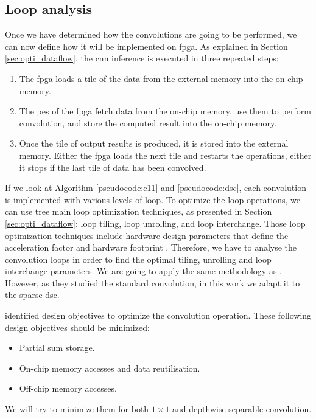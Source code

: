 \subsection{Loop analysis}
%
Once we have determined how the convolutions are going to be performed, we can now define how it will be implemented on \acrshort{fpga}. As explained in Section \ref{sec:opti_dataflow}, the \acrshort{cnn} inference is executed in three repeated steps:
%
\begin{enumerate}
    \item The \acrshort{fpga} loads a tile of the data from the external memory into the on-chip memory.
    \item The \acrshort{pe}s of the \acrshort{fpga} fetch data from the on-chip memory, use them to perform convolution, and store the computed result into the on-chip memory.
    \item Once the tile of output results is produced, it is stored into the external memory. Either the \acrshort{fpga} loads the next tile and restarts the operations, either it stops if the last tile of data has been convolved.
\end{enumerate}
%
If we look at Algorithm \ref{pseudocode:c11} and \ref{pseudocode:dsc}, each convolution is implemented with various levels of loop. To optimize the loop operations, we can use tree main loop optimization techniques, as presented in Section \ref{sec:opti_dataflow}: loop tiling, loop unrolling, and loop interchange. Those loop optimization techniques include hardware design parameters that define the acceleration factor and hardware footprint \cite{ma_optimizing_2018}. Therefore, we have to analyse the convolution loops in order to find the optimal tiling, unrolling and loop interchange parameters. We are going to apply the same methodology as \textcite{ma_optimizing_2018}. However, as they studied the standard convolution, in this work we adapt it to the sparse \acrshort{dsc}.

\textcite{ma_optimizing_2018} identified design objectives to optimize the convolution operation. These following design objectives should be minimized:
%
\begin{itemize}
    \item Partial sum storage.
    \item On-chip memory accesses and data reutilisation.
    \item Off-chip memory accesses.
\end{itemize}
%
We will try to minimize them for both $1 \times 1$ and depthwise separable convolution.
%
